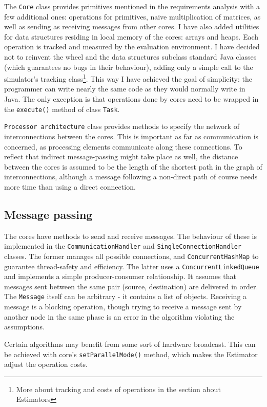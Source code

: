 \documentclass[12pt,a4paper,twoside,openright]{report}
\begin{document}
The \texttt{Core} class provides primitives mentioned in the requirements analysis with a few additional ones: operations for primitives, naive multiplication of matrices, as well as sending as receiving messages from other cores. I have also added utilities for data structures residing in local memory of the cores: arrays and heaps. Each operation is tracked and measured by the evaluation environment. I have decided not to reinvent the wheel and the data structures subclass standard Java classes (which guarantees no bugs in their behaviour), adding only a simple call to the simulator's tracking class\footnote{More about tracking and costs of operations in the section about Estimators}. This way I have achieved the goal of simplicity: the programmer can write nearly the same code as they would normally write in Java. The only exception is that operations done by cores need to be wrapped in the \texttt{execute()} method of class \texttt{Task}.

\texttt{Processor architecture} class provides methods to specify the network of interconnections between the cores. This is important as far as communication is concerned, as processing elements communicate along these connections. To reflect that indirect message-passing might take place as well, the distance between the cores is assumed to be the length of the shortest path in the graph of interconnections, although a message following a non-direct path of course needs more time than using a direct connection.

\subsection{Message passing}
The cores have methods to send and receive messages. The behaviour of these is implemented in the \texttt{CommunicationHandler} and \texttt{SingleConnectionHandler} classes. The former manages all possible connections, and \texttt{ConcurrentHashMap} to guarantee thread-safety and efficiency. The latter uses a \texttt{ConcurrentLinkedQueue} and implements a simple producer-consumer relationship. It assumes that messages sent between the same pair (source, destination) are delivered in order. The \texttt{Message} itself can be arbitrary - it contains a list of objects. Receiving a message is a blocking operation, though trying to receive a message sent by another node in the same phase is an error in the algorithm violating the assumptions.

Certain algorithms may benefit from some sort of hardware broadcast. This can be achieved with core's \texttt{setParallelMode()} method, which makes the Estimator adjust the operation costs. 
\end{document}
